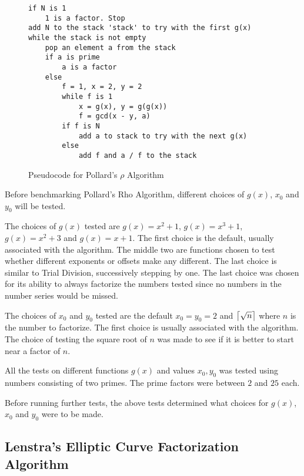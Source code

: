 \begin{figure}[H]
    \centering
    \begin{minipage}{0.5\textwidth}
        \begin{verbatim}
if N is 1
    1 is a factor. Stop
add N to the stack 'stack' to try with the first g(x)
while the stack is not empty
    pop an element a from the stack
    if a is prime
        a is a factor
    else
        f = 1, x = 2, y = 2
        while f is 1
            x = g(x), y = g(g(x))
            f = gcd(x - y, a)
        if f is N
            add a to stack to try with the next g(x)
        else
            add f and a / f to the stack
        \end{verbatim}
    \end{minipage}
    \caption{Pseudocode for Pollard's $\rho$ Algorithm}
    \label{fig:pollardsRhoAlgorithm}
\end{figure}

Before benchmarking Pollard's Rho Algorithm, different choices of $g(x)$, $x_0$ and $y_0$ will be tested.

The choices of $g(x)$ tested are $g(x)=x^2+1$, $g(x)=x^3+1$, $g(x)=x^2+3$ and $g(x)=x+1$. The first choice is the default, usually associated with the algorithm. The middle two are functions chosen to test whether different exponents or offsets make any different. The last choice is similar to Trial Division, successively stepping by one. The last choice was chosen for its ability to always factorize the numbers tested since no numbers in the number series would be missed.

The choices of $x_0$ and $y_0$ tested are the default $x_0=y_0=2$ and $\ceil[\big]{\sqrt{n}}$ where $n$ is the number to factorize. The first choice is usually associated with the algorithm. The choice of testing the square root of $n$ was made to see if it is better to start near a factor of $n$.

All the tests on different functions $g(x)$ and values $x_0, y_0$ was tested using numbers consisting of two primes. The prime factors were between $2$ and $25$ each.

Before running further tests, the above tests determined what choices for $g(x)$, $x_0$ and $y_0$ were to be made.

\subsection{Lenstra's Elliptic Curve Factorization Algorithm}

